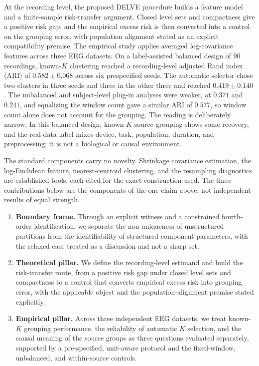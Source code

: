 At the recording level, the proposed DELVE procedure builds a feature model and a
finite-sample risk-transfer argument. Closed level sets and compactness
give a positive risk gap, and the empirical excess risk is then
converted into a control on the grouping error, with population
alignment stated as an explicit compatibility premise. The empirical
study applies averaged log-covariance features across three EEG
datasets. On a label-assisted balanced design of 90 recordings,
known-\(K\) clustering reached a recording-level adjusted Rand index
(ARI) of \(0.582\pm0.068\) across six prespecified seeds. The automatic
selector chose two clusters in three seeds and three in the other three
and reached \(0.419\pm0.140\). The unbalanced and subject-level plug-in
analyses were weaker, at \(0.371\) and \(0.241\), and equalizing the
window count gave a similar ARI of \(0.577\), so window count alone does
not account for the grouping. The reading is deliberately narrow. In
this balanced design, known-\(K\) source grouping shows some recovery,
and the real-data label mixes device, task, population, duration, and
preprocessing; it is not a biological or causal environment.

The standard components carry no novelty. Shrinkage covariance
estimation, the log-Euclidean feature, nearest-centroid clustering, and
the resampling diagnostics are established tools, each cited for the
exact construction used. The three contributions below are the
components of the one claim above, not independent results of equal
strength.

\begin{enumerate}
\def\labelenumi{\arabic{enumi}.}
\item
  \textbf{Boundary frame.} Through an explicit witness and a constrained
  fourth-order identification, we separate the non-uniqueness of
  unstructured partitions from the identifiability of structured
  component parameters, with the relaxed case treated as a discussion
  and not a sharp set.
\item
  \textbf{Theoretical pillar.} We define the recording-level estimand
  and build the risk-transfer route, from a positive risk gap under
  closed level sets and compactness to a control that converts empirical
  excess risk into grouping error, with the applicable object and the
  population-alignment premise stated explicitly.
\item
  \textbf{Empirical pillar.} Across three independent EEG datasets, we
  treat known-\(K\) grouping performance, the reliability of automatic
  \(K\) selection, and the causal meaning of the source groups as three
  questions evaluated separately, supported by a pre-specified,
  unit-aware protocol and the fixed-window, unbalanced, and
  within-source controls.
\end{enumerate}

